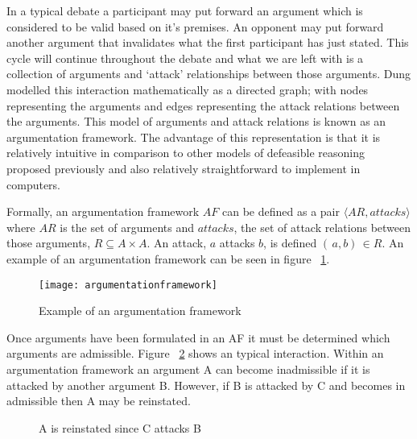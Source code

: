 In a typical debate a participant may put forward an argument which is considered to be valid based on it's premises. An opponent may put forward another argument that invalidates what the first participant has just stated. This cycle will continue throughout the debate and what we are left with is a collection of arguments and `attack' relationships between those arguments. Dung modelled this interaction mathematically as a directed graph; with nodes representing the arguments and edges representing the attack relations between the arguments. This model of arguments and attack relations is known as an argumentation framework. The advantage of this representation is that it is relatively intuitive in comparison to other models of defeasible reasoning proposed previously and also relatively straightforward to implement in computers.

Formally, an argumentation framework $AF$ can be defined as a pair $\langle AR,attacks \rangle$ where $AR$ is the set of arguments and $attacks$, the set of attack relations between those arguments, $R \subseteq A \times A$. An attack, $a$ attacks $b$, is defined $ ( \, a , b ) \, \in R$. An example of an argumentation framework can be seen in figure ~\ref{fig:argframework}.

\begin{figure}[h]
\caption{Example of an argumentation framework}
\centering
\texttt{[image: argumentationframework]}
\label{fig:argframework}
\end{figure}

Once arguments have been formulated in an AF it must be determined which arguments are admissible. Figure ~\ref{fig:arginteration} shows an typical interaction. Within an argumentation framework an argument A can become inadmissible if it is attacked by another argument B. However, if B is attacked by C and becomes in admissible then A may be reinstated.

\begin{figure}[h]
\centering
{}
\caption{A is reinstated since C attacks B}
\label{fig:arginteration}
\end{figure}

